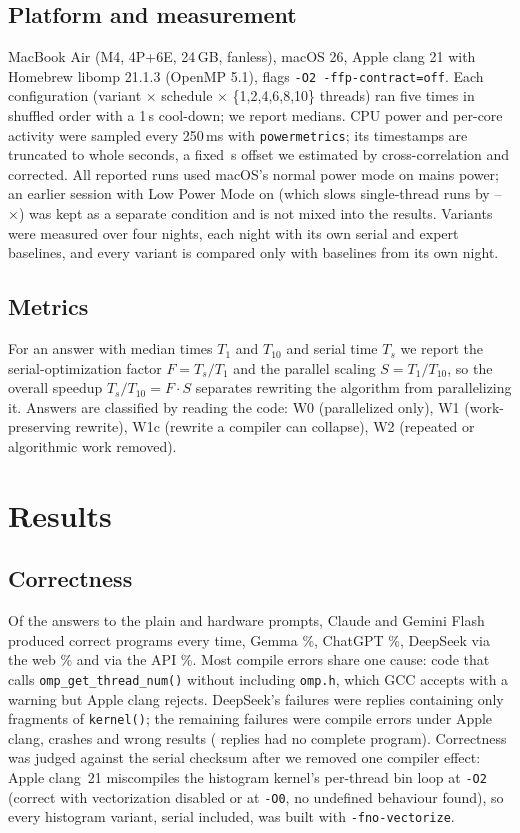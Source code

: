 \documentclass[conference]{IEEEtran}
\begin{document}
\subsection{Platform and measurement}
MacBook Air (M4, 4P+6E, 24\,GB, fanless), macOS 26, Apple clang 21 with Homebrew libomp 21.1.3 (OpenMP 5.1), flags \texttt{-O2 -ffp-contract=off}. Each configuration (variant $\times$ schedule $\times$ \{1,2,4,6,8,10\} threads) ran five times in shuffled order with a 1\,s cool-down; we report medians. CPU power and per-core activity were sampled every 250\,ms with \texttt{powermetrics}; its timestamps are truncated to whole seconds, a fixed \NumPowerOffset\,s offset we estimated by cross-correlation and corrected. All reported runs used macOS's normal power mode on mains power; an earlier session with Low Power Mode on (which slows single-thread runs by \NumLpmMin--\NumLpmMax$\times$) was kept as a separate condition and is not mixed into the results. Variants were measured over four nights, each night with its own serial and expert baselines, and every variant is compared only with baselines from its own night.

\subsection{Metrics}
For an answer with median times $T_1$ and $T_{10}$ and serial time $T_s$ we report the serial-optimization factor $F=T_s/T_1$ and the parallel scaling $S=T_1/T_{10}$, so the overall speedup $T_s/T_{10}=F\cdot S$ separates rewriting the algorithm from parallelizing it. Answers are classified by reading the code: W0 (parallelized only), W1 (work-preserving rewrite), W1c (rewrite a compiler can collapse), W2 (repeated or algorithmic work removed).

\section{Results}
\subsection{Correctness}
Of the \NumOrigAnswers{} answers to the plain and hardware prompts, Claude and Gemini Flash produced correct programs every time, Gemma \NumCorrectGemma\%, ChatGPT \NumCorrectChatgpt\%, DeepSeek via the web \NumCorrectDeepseek\% and via the API \NumCorrectDsapi\%. Most compile errors share one cause: code that calls \texttt{omp\_get\_thread\_num()} without including \texttt{omp.h}, which GCC accepts with a warning but Apple clang rejects. DeepSeek's failures were replies containing only fragments of \texttt{kernel()}; the remaining failures were \NumOrigCompile{} compile errors under Apple clang, \NumOrigCrash{} crashes and \NumOrigWrong{} wrong results (\NumOrigNoCode{} replies had no complete program). Correctness was judged against the serial checksum after we removed one compiler effect: Apple clang~21 miscompiles the histogram kernel's per-thread bin loop at \texttt{-O2} (correct with vectorization disabled or at \texttt{-O0}, no undefined behaviour found), so every histogram variant, serial included, was built with \texttt{-fno-vectorize}.
\end{document}
